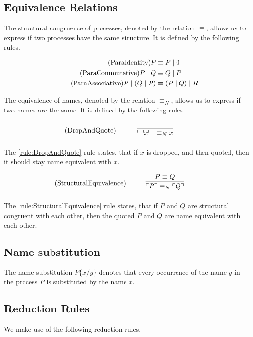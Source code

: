 \subsection{Equivalence Relations}
The structural congruence of processes, denoted by the relation $\equiv$, allows us to express if two processes have the same structure. It is defined by the following rules.

\begin{align*}
    \tag{ParaIdentity}P&\equiv P\mid 0\\
    \tag{ParaCommutative}\label{rule:ParaCommutative}P\mid Q &\equiv Q\mid P\\
    \tag{ParaAssociative}P\mid (Q\mid R)&\equiv (P\mid Q)\mid R
\end{align*}


\FloatBarrier

The equivalence of names, denoted by the relation $\equiv _N$, allows us to express if two names are the same. It is defined by the following rules.

\begin{align}
    \tag{DropAndQuote}\label{rule:DropAndQuote}\infrule{}{\quot{\drop{x}}\equiv _N x}
\end{align}

\noindent
The \ref{rule:DropAndQuote} rule states, that if $x$ is dropped, and then quoted, then it should stay name equivalent with $x$.

\begin{align}
    \tag{StructuralEquivalence}\label{rule:StructuralEquivalence}\infrule{P\equiv Q}{\quot{P} \equiv _N \quot{Q}}
\end{align}

\noindent
The \ref{rule:StructuralEquivalence} rule states, that if $P$ and $Q$ are structural congruent with each other, then the quoted $P$ and $Q$ are name equivalent with each other.

\FloatBarrier

\subsection{Name substitution} The name substitution $P\{x/y\}$ denotes that every occurrence of the name $y$ in the process $P$ is substituted by the name $x$.

\subsection{Reduction Rules}
We make use of the following reduction rules.

